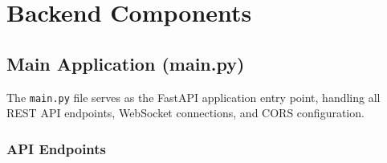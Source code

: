 \documentclass[12pt,a4paper,oneside]{book}
\begin{document}
\chapter{Backend Components}

\section{Main Application (main.py)}

The \texttt{main.py} file serves as the FastAPI application entry point, handling all REST API endpoints, WebSocket connections, and CORS configuration.

\subsection{API Endpoints}
\end{document}
